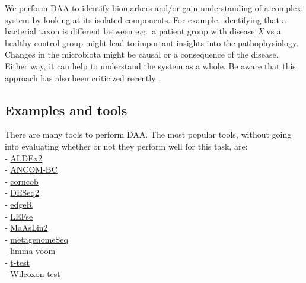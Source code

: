 \documentclass[
]{book}
\begin{document}
We perform DAA to identify biomarkers and/or gain understanding of a
complex system by looking at its isolated components. For example,
identifying that a bacterial taxon is different between e.g.~a patient
group with disease \emph{X} vs a healthy control group might lead to
important insights into the pathophysiology. Changes in the microbiota
might be causal or a consequence of the disease. Either way, it can
help to understand the system as a whole. Be aware that this approach
has also been criticized recently \citep{quinnCritiqueDifferentialAbundance2021}.

\hypertarget{examples-and-tools}{%
\subsection{Examples and tools}\label{examples-and-tools}}

There are many tools to perform DAA. The most popular tools, without going into
evaluating whether or not they perform well for this task, are:\\
- \href{https://bioconductor.org/packages/release/bioc/html/ALDEx2.html}{ALDEx2}\\
- \href{https://bioconductor.org/packages/release/bioc/html/ANCOMBC.html}{ANCOM-BC}\\
- \href{https://cran.r-project.org/web/packages/corncob/index.html}{corncob}\\
- \href{https://bioconductor.org/packages/release/bioc/html/DESeq2.html}{DESeq2}\\
- \href{https://bioconductor.org/packages/release/bioc/html/edgeR.html}{edgeR}\\
- \href{https://bioconductor.org/packages/release/bioc/html/lefser.html}{LEFse}\\
- \href{https://www.bioconductor.org/packages/release/bioc/html/Maaslin2.html}{MaAsLin2}\\
- \href{https://www.bioconductor.org/packages/release/bioc/html/metagenomeSeq.html}{metagenomeSeq}\\
- \href{https://bioconductor.org/packages/release/bioc/html/limma.html}{limma voom}\\
- \href{https://www.rdocumentation.org/packages/stats/versions/3.6.2/topics/t.test}{t-test}\\
- \href{https://www.rdocumentation.org/packages/stats/versions/3.6.2/topics/wilcox.test}{Wilcoxon test}
\end{document}

